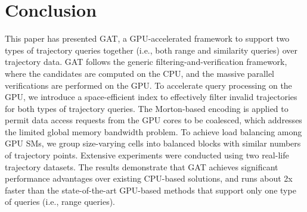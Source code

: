 \documentclass[10pt,conference,letterpaper]{IEEEtran}
\newcommand{\frname}{GAT\xspace }
\begin{document}



\section{Conclusion}\label{sec:conclusion}

This paper has presented \frname, a GPU-accelerated framework to support two types of trajectory queries together (i.e., both range and similarity queries) over trajectory data. \frname follows the generic filtering-and-verification framework, where the candidates are computed on the CPU, and the massive parallel verifications are performed on the GPU.
To accelerate query processing on the GPU, we introduce a space-efficient index to effectively filter invalid trajectories for both types of trajectory queries. The Morton-based encoding is applied to permit data access requests from the GPU cores to be coalesced, which addresses the limited global memory bandwidth problem. To achieve load balancing among GPU SMs, we group size-varying cells into balanced blocks with similar numbers of trajectory points. Extensive experiments were conducted using two real-life trajectory datasets. The results demonstrate that GAT achieves significant performance advantages over existing CPU-based solutions, and runs about 2x faster than the state-of-the-art GPU-based methods that support only one type of queries (i.e., range queries).




\end{document}
